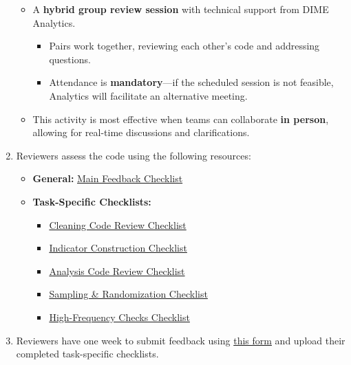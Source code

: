 \documentclass{tufte-handout}
\begin{document}
\begin{fullwidth}
\begin{enumerate}
\begin{itemize}
        \item A \textbf{hybrid group review session} with technical support from DIME Analytics.
        \begin{itemize}
            \item Pairs work together, reviewing each other's code and addressing questions.
            \item Attendance is \textbf{mandatory}—if the scheduled session is not feasible, Analytics will facilitate an alternative meeting.
        \end{itemize}
        \item This activity is most effective when teams can collaborate \textbf{in person}, allowing for real-time discussions and clarifications.
    \end{itemize}
    \item Reviewers assess the code using the following resources:
    \begin{itemize}
        \item \textbf{General:} \href{https://github.com/worldbank/dime-standards/blob/master/dime-coding-standards/checklists/Reviewer%20Feedback%20Checklist.pdf}{Main Feedback Checklist}
        \item \textbf{Task-Specific Checklists:}
        \begin{itemize}
            \item \href{https://github.com/worldbank/dime-standards/blob/master/dime-coding-standards/checklists/Cleaning%20Code%20Review%20Checklist.pdf}{Cleaning Code Review Checklist}
            \item \href{https://github.com/worldbank/dime-standards/blob/master/dime-coding-standards/checklists/Construction%20Code%20Review%20Checklist.pdf}{Indicator Construction Checklist}
            \item \href{https://github.com/worldbank/dime-standards/blob/master/dime-coding-standards/checklists/Analysis%20Code%20Review%20Checklist.pdf}{Analysis Code Review Checklist}
            \item \href{https://github.com/worldbank/dime-standards/blob/master/dime-coding-standards/checklists/Sampling%20and%20Random%20Treatment%20Assignment%20Checklist.pdf}{Sampling \& Randomization Checklist}
            \item \href{https://github.com/worldbank/dime-standards/blob/master/dime-coding-standards/checklists/HFCs%20Checklist.pdf}{High-Frequency Checks Checklist}
        \end{itemize}
    \end{itemize}
    \item Reviewers have one week to submit feedback using \href{https://survey.wb.surveycto.com/collect/code_review_summary?caseid=}{this form} and upload their completed task-specific checklists.
\end{enumerate}


\end{fullwidth}
\end{document}
